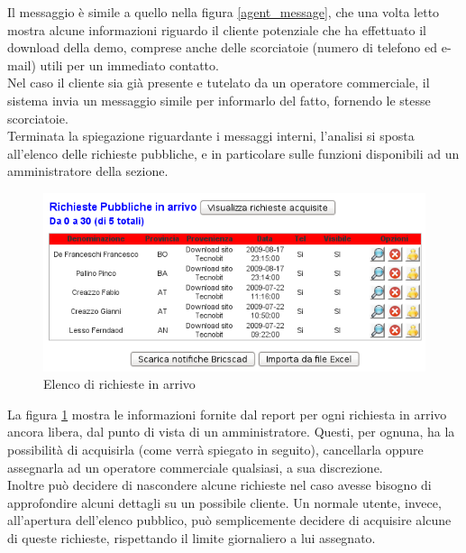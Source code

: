 \noindent
Il messaggio \`e simile a quello nella figura \ref{agent_message}, che una volta letto mostra alcune informazioni riguardo il cliente potenziale che ha effettuato il download della demo, comprese anche delle scorciatoie (numero di telefono ed e-mail) utili per un immediato contatto. \\
Nel caso il cliente sia gi\`a presente e tutelato da un operatore commerciale, il sistema invia un messaggio simile per informarlo del fatto, fornendo le stesse scorciatoie.  \\
Terminata la spiegazione riguardante i messaggi interni, l'analisi si sposta all'elenco delle richieste pubbliche, e in particolare sulle funzioni disponibili ad un amministratore della sezione.
\newpage

\begin{figure}[!ht]
\centering
  \includegraphics[scale=0.6]{./images/elencoRichiesteScreen.png}
\caption{Elenco di richieste in arrivo}
\label{elenco_richieste}
\end{figure}

\noindent
La figura \ref{elenco_richieste} mostra le informazioni fornite dal report per ogni richiesta in arrivo ancora libera, dal punto di vista di un amministratore. Questi, per ognuna, ha la possibilit\`a di acquisirla (come verr\`a spiegato in seguito), cancellarla oppure assegnarla ad un operatore commerciale qualsiasi, a sua discrezione. \\
Inoltre pu\`o decidere di nascondere alcune richieste nel caso avesse bisogno di approfondire alcuni dettagli su un possibile cliente.
Un normale utente, invece, all'apertura dell'elenco pubblico, pu\`o semplicemente decidere di acquisire alcune di queste richieste, rispettando il limite giornaliero a lui assegnato. 

